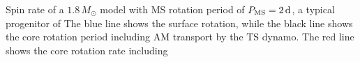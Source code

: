  \label{fig:MRI1.8rot} Spin rate of a $1.8 \, M_\odot$ model with MS rotation period of $P_{\rm MS} = 2 \, {\rm d}$, a typical progenitor of  The blue line shows the surface rotation, while the black line shows the core rotation period including AM transport by the TS dynamo. The red line shows the core rotation rate including